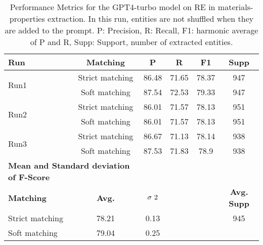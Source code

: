 \begin{table}[htbp]
    \small
    \centering
    \caption{Performance Metrics for the GPT4-turbo model on RE in materials-properties extraction. In this run, entities are not shuffled when they are added to the prompt. P: Precision, R: Recall, F1: harmonic average of P and R, Supp: Support, number of extracted entities.}
    \begin{tabular}{lccccc}
        \toprule
        \textbf{Run} & \textbf{Matching} & \textbf{P} & \textbf{R} & \textbf{F1} & \textbf{Supp}\\
        \midrule
        \multirow{2}{*}{Run1} & Strict matching & 86.48 & 71.65 & 78.37 & 947 \\
        & Soft matching & 87.54 & 72.53 & 79.33 & 947 \\
        \midrule
        \multirow{2}{*}{Run2} & Strict matching & 86.01 & 71.57 & 78.13 & 951 \\
        & Soft matching & 86.01 & 71.57 & 78.13 & 951 \\
        \midrule
        \multirow{2}{*}{Run3} & Strict matching & 86.67 & 71.13 & 78.14 & 938 \\
        & Soft matching & 87.53 & 71.83 & 78.9 & 938 \\
        \midrule
        \multicolumn{2}{l}{\textbf{Mean and Standard deviation of F-Score}} & & & & \\
        \midrule
        \textbf{Matching} & \textbf{Avg.} & $\sigma\textsuperscript{2}$ & & & \textbf{Avg. Supp}\\
        Strict matching & 78.21 & 0.13 & & & 945 \\
        Soft matching & 79.04 & 0.25 & & \\
        \bottomrule
    \end{tabular}
\end{table}


